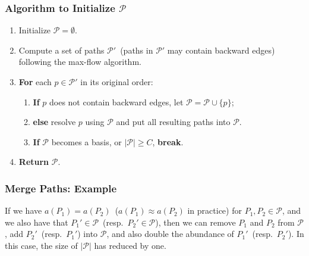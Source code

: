 \frame
{
	\frametitle{Algorithm to Initialize $\mathcal{P}$}

	\begin{enumerate}
	\item Initialize $\mathcal{P} = \emptyset$.
	\vspace{0.2cm}
	\item Compute a set of paths $\mathcal{P}'$~(paths in $\mathcal{P}'$ may contain backward edges) following the max-flow algorithm.
	\vspace{0.2cm}
	\item {\bf For} each $p\in\mathcal{P}'$ in its original order:
		\begin{enumerate}
		\vspace{0.1cm}
		\item {\bf If} $p$ does not contain backward edges, let $\mathcal{P} = \mathcal{P}\cup\{p\}$;
		\vspace{0.1cm}
		\item {\bf else} resolve $p$ using $\mathcal{P}$ and put all resulting paths into $\mathcal{P}$.
		\vspace{0.1cm}
		\item {\bf If} $\mathcal{P}$ becomes a basis, or $|\mathcal{P}| \ge C$, {\bf break}.
		\end{enumerate}
	\vspace{0.2cm}
	\item {\bf Return} $\mathcal{P}$.
	\end{enumerate}
}



\frame
{
	\frametitle{Merge Paths: Example}

	\vspace{0.1cm}
	
	\vspace{3.0cm}

	If we have $a(P_1) = a(P_2)$~($a(P_1) \approx a(P_2)$ in practice) for $P_1, P_2\in\mathcal{P}$,
			and we also have that $P_1'\in\mathcal{P}$~(resp.\ $P_2'\in\mathcal{P}$),
	then we can remove $P_1$ and $P_2$ from $\mathcal{P}$, add $P_2'$~(resp.\ $P_1'$) into $\mathcal{P}$,
	and also double the abundance of $P_1'$~(resp.\ $P_2'$). In this case, the size
	of $|\mathcal{P}|$ has reduced by one.
	
}
